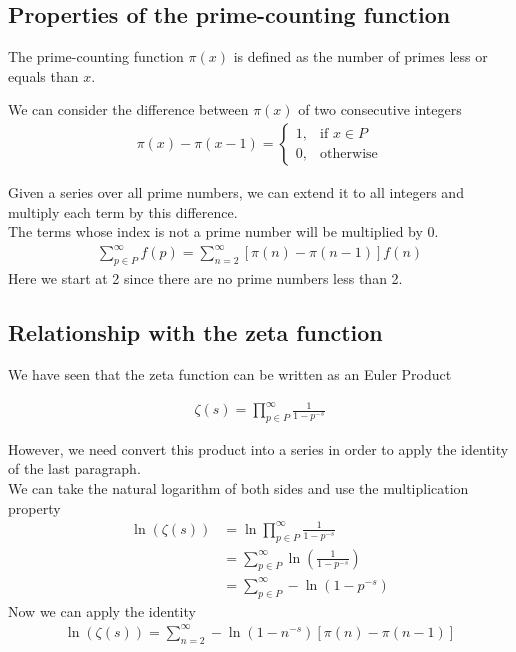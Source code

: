 \documentclass[a4paper]{article}
\begin{document}
\subsection{Properties of the prime-counting function}

The prime-counting function \(\pi(x)\) is defined as the number of primes less or equals than \(x\).

We can consider the difference between \(\pi(x)\) of two consecutive integers
\begin{align*}
    \pi (x)-\pi (x-1)= 
    \begin{cases}
        1,& \text{if } x\in P
        \\
        0,& \text{otherwise}
    \end{cases}
\end{align*}

Given a series over all prime numbers, we can extend it to all integers and multiply each term by this difference.
\\
The terms whose index is not a prime number will be multiplied by 0.
\begin{align*}
    \sum_{p\in P}^{\infty}f(p)=\sum_{n=2}^{\infty}\left[\pi(n)-\pi(n-1)\right]f(n)
\end{align*}
Here we start at 2 since there are no prime numbers less than 2.

\subsection{Relationship with the zeta function}

We have seen that the zeta function can be written as an Euler Product

\begin{align*}
    \zeta (s)=\prod_{p\in P}^{\infty}\frac{1}{1-p^{-s}}
\end{align*}

However, we need convert this product into a series in order to apply the identity of the last paragraph.
\\
We can take the natural logarithm of both sides and use the multiplication property
\begin{align*}
    \ln\left(\zeta (s)\right)&=\ln\prod_{p\in P}^{\infty}\frac{1}{1-p^{-s}}
    \\
    &=\sum_{p\in P}^{\infty}\ln\left(\frac{1}{1-p^{-s}}\right)
    \\
    &=\sum_{p\in P}^{\infty}-\ln\left(1-p^{-s}\right)
\end{align*}
Now we can apply the identity
\begin{align*}
    \ln\left(\zeta (s)\right)=\sum_{n=2}^{\infty}-\ln\left(1-n^{-s}\right)\left[\pi (n) - \pi (n-1)\right]
\end{align*}
\end{document}
